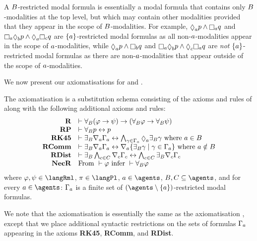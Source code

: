 A $B$-restricted modal formula is essentially a modal formula that contains only $B$-modalities at the top level, but which may contain other modalities provided that they appear in the scope of $B$-modalities.
For example, $\possibleA \atomP \land \necessaryA \atomQ$ and $\necessaryA \possibleB \atomP \land \possibleA \necessaryC \atomQ$ are $\{a\}$-restricted modal formulas as all non-$a$-modalities appear in the scope of $a$-modalities, while $\possibleA \atomP \land \necessaryB \atomQ$ and $\necessaryA \possibleB \atomP \land \possibleC \necessaryA \atomQ$ are {\em not} $\{a\}$-restricted modal formulas as there are non-$a$-modalities that appear outside of the scope of $a$-modalities.

We now present our axiomatisations for \logicRmlKFF{} and \logicRmlKD{}.

\begin{definition}
The axiomatisation \axiomRmlKFF{} is a substitution schema consisting of the axioms and rules of \axiomKFF{} along with the following additional axioms and rules:
$$
\begin{array}{rl}
    {\bf R} & \proves \allrefsBs (\phi \implies \psi) \implies (\allrefsBs \phi \implies \allrefsBs \psi)\\
    {\bf RP} & \proves \allrefsBs \atomP \iff \atomP\\
    {\bf RK45} & \proves \somerefsBs \coversA \Gamma_\agentA \iff \bigwedge_{\gamma \in \Gamma_\agentA} \possibleA \somerefsBs \gamma \text{ where } \agentA \in \agentsB\\
    {\bf RComm} & \proves \somerefsBs \coversA \Gamma_\agentA \iff \coversA \{\somerefsBs \gamma \mid \gamma \in \Gamma_\agentA\} \text{ where } \agentA \notin \agentsB\\
    {\bf RDist} & \proves \somerefsBs \bigwedge_{\agentC \in \agentsC} \coversC \Gamma_\agentC \iff \bigwedge_{\agentC \in \agentsC} \somerefsBs \coversC \Gamma_\agentC\\
    {\bf NecR} & \text{From } \proves \phi \text{ infer } \proves \allrefsBs \phi
\end{array}
$$
where $\phi, \psi \in \langRml$, $\pi \in \langPl$, $\agentA \in \agents$, $\agentsB, \agentsC \subseteq \agents$, and for every $\agentA \in \agents$: $\Gamma_a$ is a finite set of $(\agents \setminus \{\agentA\})$-restricted modal formulas.
\end{definition}

We note that the axiomatisation \axiomRmlKFF{} is essentially the same as the axiomatisation \axiomRmlK{}, except that we place additional syntactic restrictions on the sets of formulas $\Gamma_a$ appearing in the axioms {\bf RK45}, {\bf RComm}, and {\bf RDist}.

